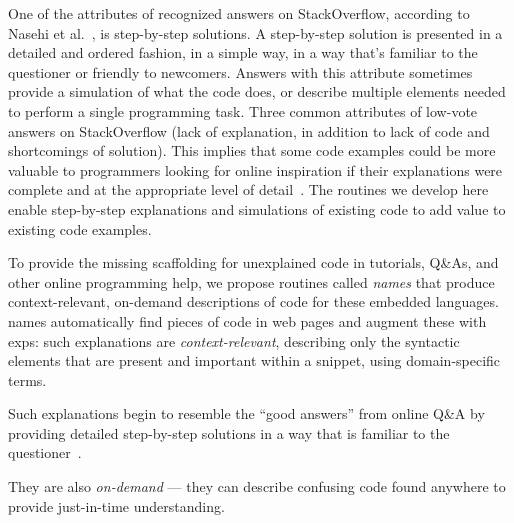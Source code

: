 \begin{changes}
One of the attributes of recognized answers on StackOverflow, according to Nasehi et al.~\cite{nasehi_what_2012}, is step-by-step solutions.
A step-by-step solution is presented in a detailed and ordered fashion, in a simple way, in a way that's familiar to the questioner or friendly to newcomers.
Answers with this attribute sometimes provide a simulation of what the code does, or describe multiple elements needed to perform a single programming task. 
Three common attributes of low-vote answers on StackOverflow (lack of explanation, in addition to lack of code and shortcomings of solution).
This implies that some code examples could be more valuable to programmers looking for online inspiration if their explanations were complete and at the appropriate level of detail~\cite{nasehi_what_2012}.
\fi
The routines we develop here enable step-by-step explanations and simulations of existing code to add value to existing code examples.
\end{changes}
\fi

To provide the missing scaffolding for unexplained code in tutorials, Q\&As, and other online programming help, we propose routines called \emph{\Glspl{name}} that produce context-relevant, on-demand descriptions of code for these embedded languages.
\Glspl{name} automatically find pieces of code in web pages and augment these with \glspl{exp}: such explanations are \emph{context-relevant}, describing only the syntactic elements that are present and important within a snippet, using domain-specific terms.
\begin{changes}
Such explanations begin to resemble the ``good answers'' from online Q\&A by providing detailed step-by-step solutions in a way that is familiar to the questioner~\cite{nasehi_what_2012}.
\end{changes}
\fi
They are also \emph{on-demand} --- they can describe confusing code found anywhere to provide just-in-time understanding.

